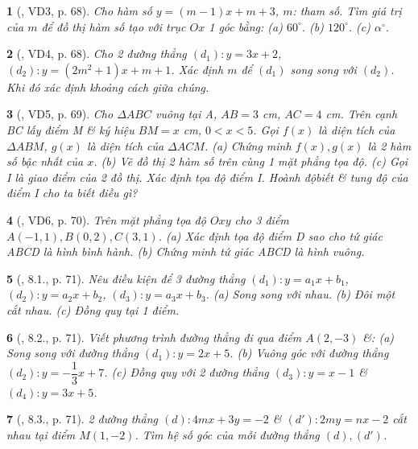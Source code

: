 \documentclass{article}
\newtheorem{baitoan}{}
\begin{document}
\begin{baitoan}[\cite{Binh_boi_duong_Toan_9_tap_1}, VD3, p. 68]
	Cho hàm số $y = (m - 1)x + m + 3$, $m$: tham số. Tìm giá trị của $m$ để đồ thị hàm số tạo với trục $Ox$ 1 góc bằng: (a) $60^\circ$. (b) $120^\circ$. (c) $\alpha^\circ$.
\end{baitoan}

\begin{baitoan}[\cite{Binh_boi_duong_Toan_9_tap_1}, VD4, p. 68]
	Cho 2 đường thẳng $(d_1):y = 3x + 2$, $(d_2):y = (2m^2 + 1)x + m + 1$. Xác định $m$ để $(d_1)$ song song với $(d_2)$. Khi đó xác định khoảng cách giữa chúng.
\end{baitoan}

\begin{baitoan}[\cite{Binh_boi_duong_Toan_9_tap_1}, VD5, p. 69]
	Cho $\Delta ABC$ vuông tại A, $AB = 3$ {\rm cm}, $AC = 4$ {\rm cm}. Trên cạnh BC lấy điểm M \& ký hiệu $BM = x$ {\rm cm}, $0 < x < 5$. Gọi $f(x)$ là diện tích của $\Delta ABM$, $g(x)$ là diện tích của $\Delta ACM$. (a) Chứng minh $f(x),g(x)$ là 2 hàm số bậc nhất của $x$. (b) Vẽ đồ thị 2 hàm số trên cùng 1 mặt phẳng tọa độ. (c) Gọi I là giao điểm của 2 đồ thị. Xác định tọa độ điểm I. Hoành độbiết \& tung độ của điểm I cho ta biết điều gì?
\end{baitoan}

\begin{baitoan}[\cite{Binh_boi_duong_Toan_9_tap_1}, VD6, p. 70]
	Trên mặt phẳng tọa độ $Oxy$ cho 3 điểm $A(-1,1),B(0,2),C(3,1)$. (a) Xác định tọa độ điểm D sao cho tứ giác ABCD là hình bình hành. (b) Chứng minh tứ giác ABCD là hình vuông.
\end{baitoan}

\begin{baitoan}[\cite{Binh_boi_duong_Toan_9_tap_1}, 8.1., p. 71]
	Nêu điều kiện để 3 đường thẳng $(d_1):y = a_1x + b_1$, $(d_2):y = a_2x + b_2$, $(d_3):y = a_3x + b_3$. (a) Song song với nhau. (b) Đôi một cắt nhau. (c) Đồng quy tại 1 điểm.
\end{baitoan}

\begin{baitoan}[\cite{Binh_boi_duong_Toan_9_tap_1}, 8.2., p. 71]
	Viết phương trình đường thẳng đi qua điểm $A(2,-3)$ \&: (a) Song song với đường thẳng $(d_1):y = 2x + 5$. (b) Vuông góc với đường thẳng $(d_2):y = -\dfrac{1}{3}x + 7$. (c) Đồng quy với 2 đường thẳng $(d_3):y = x - 1$ \& $(d_4):y = 3x + 5$.
\end{baitoan}

\begin{baitoan}[\cite{Binh_boi_duong_Toan_9_tap_1}, 8.3., p. 71]
	2 đường thẳng $(d):4mx + 3y = -2$ \& $(d'):2my = nx - 2$ cắt nhau tại điểm $M(1,-2)$. Tìm hệ số góc của mỗi đường thẳng $(d),(d')$.
\end{baitoan}
\end{document}
